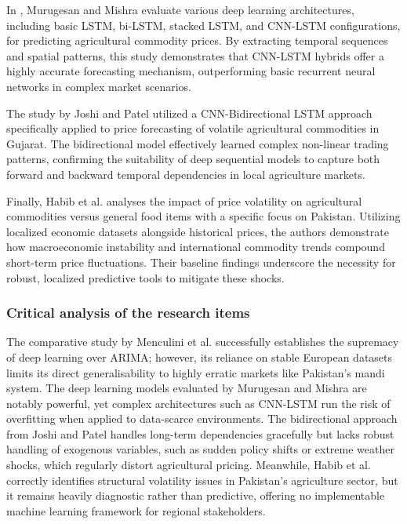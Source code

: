 \documentclass{FastFyp}
\begin{document}
In \cite{murugesan2022forecasting}, Murugesan and Mishra evaluate various deep learning architectures, including basic LSTM, bi-LSTM, stacked LSTM, and CNN-LSTM configurations, for predicting agricultural commodity prices. By extracting temporal sequences and spatial patterns, this study demonstrates that CNN-LSTM hybrids offer a highly accurate forecasting mechanism, outperforming basic recurrent neural networks in complex market scenarios.

The study by Joshi and Patel \cite{joshi2022cnn} utilized a CNN-Bidirectional LSTM approach specifically applied to price forecasting of volatile agricultural commodities in Gujarat. The bidirectional model effectively learned complex non-linear trading patterns, confirming the suitability of deep sequential models to capture both forward and backward temporal dependencies in local agriculture markets.

Finally, Habib et al. \cite{habib2021impact} analyses the impact of price volatility on agricultural commodities versus general food items with a specific focus on Pakistan. Utilizing localized economic datasets alongside historical prices, the authors demonstrate how macroeconomic instability and international commodity trends compound short-term price fluctuations. Their baseline findings underscore the necessity for robust, localized predictive tools to mitigate these shocks.

\subsubsection{Critical analysis of the research items}
The comparative study by Menculini et al. \cite{menculini2021comparing} successfully establishes the supremacy of deep learning over ARIMA; however, its reliance on stable European datasets limits its direct generalisability to highly erratic markets like Pakistan's mandi system. The deep learning models evaluated by Murugesan and Mishra \cite{murugesan2022forecasting} are notably powerful, yet complex architectures such as CNN-LSTM run the risk of overfitting when applied to data-scarce environments. The bidirectional approach from Joshi and Patel \cite{joshi2022cnn} handles long-term dependencies gracefully but lacks robust handling of exogenous variables, such as sudden policy shifts or extreme weather shocks, which regularly distort agricultural pricing. Meanwhile, Habib et al. \cite{habib2021impact} correctly identifies structural volatility issues in Pakistan's agriculture sector, but it remains heavily diagnostic rather than predictive, offering no implementable machine learning framework for regional stakeholders.
\end{document}
